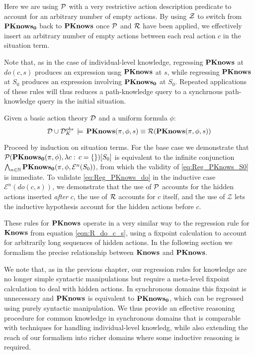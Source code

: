 Here we are using $\mathcal{P}$ with a very restrictive action description
predicate to account for an arbitrary number of empty actions. By
using $\mathcal{Z}$ to switch from $\mathbf{PKnows_{0}}$ back to $\mathbf{PKnows}$ once $\mathcal{P}$
and $\mathcal{R}$ have been applied, we effectively insert an arbitrary
number of empty actions between each real action $c$ in the situation
term.

Note that, as in the case of individual-level knowledge, regressing
$\mathbf{PKnows}$ at $do(c,s)$ produces an expression usng $\mathbf{PKnows}$ at
$s$, while regressing $\mathbf{PKnows}$ at $S_{0}$ produces an expression
involving $\mathbf{PKnows_{0}}$ at $S_{0}$. Repeated applications of these
rules will thus reduces a path-knowledge query to a synchrnous path-knowledge
query in the initial situation.

\begin{thm}
\label{thm:Reg_PKnows}Given a basic action theory $\mathcal{D}$ and a uniform
formula $\phi$:\[
\mathcal{D}\cup\mathcal{D}_{K}^{obs}\,\models\,\mathbf{PKnows}(\pi,\phi,s)\equiv\mathcal{R}(\mathbf{PKnows}(\pi,\phi,s))\]

\end{thm}
\begin{proofsketch}
Proceed by induction on situation terms. For the base case we demonstrate
that $\mathcal{P}(\mathbf{PKnows_{0}}(\pi,\phi),\lambda c:\, c=\{\})[S_{0}]$ is equivalent
to the infinite conjunction $\bigwedge_{n\in\mathbb{N}}\mathbf{PKnows_{0}}(\pi,\phi,\mathcal{E}^{n}(S_{0}))$,
from which the validity of \eqref{eq:Reg_PKnows_S0} is immediate.
To validate \eqref{eq:Reg_PKnows_do} in the inductive case $\mathcal{E}^{n}(do(c,s))$,
we demonstrate that the use of $\mathcal{P}$ accounts for the hidden actions
inserted \emph{after} $c$, the use of $\mathcal{R}$ accounts for $c$ itself,
and the use of $\mathcal{Z}$ lets the inductive hypothesis account
for the hidden actions before $c$. 
\end{proofsketch}
These rules for $\mathbf{PKnows}$ operate in a very similar way to the regression
rule for $\mathbf{Knows}$ from equation \eqref{eqn:R_do_c_s}, using a fixpoint
calculation to account for arbitrarily long sequences of hidden actions.
In the following section we formalism the precise relationship between
$\mathbf{Knows}$ and $\mathbf{PKnows}$.

We note that, as in the previous chapter, our regression rules for
knowledge are no longer simple syntactic manipulations but require
a meta-level fixpoint calculation to deal with hidden actions. In
synchronous domains this fixpoint is unnecessary and $\mathbf{PKnows}$ is
equivalent to $\mathbf{PKnows_{0}}$, which can be regressed using purely syntactic
manipulation. We thus provide an effective reasoning procedure for
common knowledge in synchronous domains that is comparable with techniques
for handling individual-level knowledg, while also extending the reach
of our formalism into richer domains where some inductive reasoning
is required.

